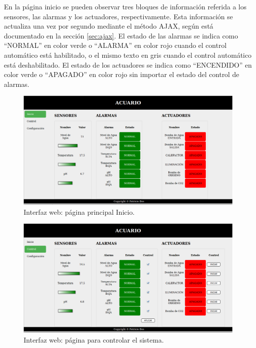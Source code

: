 En la página inicio se pueden observar tres bloques de información referida a los sensores, las alarmas y los actuadores, respectivamente.  Esta información se actualiza una vez por segundo mediante el método AJAX, según está documentado en la sección \ref{sec:ajax}. El estado de las alarmas se indica como ``NORMAL'' en color verde o ``ALARMA'' en color rojo cuando el control automático está habilitado, o el mismo texto en gris cuando el control automático está deshabilitado.  El estado de los actuadores se indica como ``ENCENDIDO'' en color verde o ``APAGADO'' en color rojo sin importar el estado del control de alarmas.

\begin{figure}[htp]
	\centering
    \includegraphics[width=\textwidth]{./Figures/interfaz_home_normal}
	\caption{Interfaz web: página principal Inicio.}
	\label{fig:interfazHome}
\end{figure}

\begin{figure}[htp]
	\centering
    \includegraphics[width=\textwidth]{./Figures/interfaz_control_normal}
	\caption{Interfaz web: página para controlar el sistema.}
	\label{fig:interfazControl}
\end{figure}

